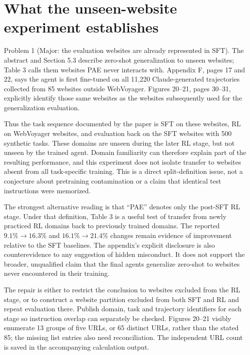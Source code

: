 \documentclass[10pt]{article}
\begin{document}
\section*{What the unseen-website experiment establishes}
Problem 1 (Major: the evaluation websites are already represented in SFT).  The abstract and Section 5.3 describe zero-shot generalization to unseen websites; Table 3 calls them websites PAE never interacts with. Appendix F, pages 17 and 22, says the agent is first fine-tuned on all 11,220 Claude-generated trajectories collected from 85 websites outside WebVoyager. Figures 20–21, pages 30–31, explicitly identify those same websites as the websites subsequently used for the generalization evaluation.\par
Thus the task sequence documented by the paper is SFT on these websites, RL on WebVoyager websites, and evaluation back on the SFT websites with 500 synthetic tasks. These domains are unseen during the later RL stage, but not unseen by the trained agent. Domain familiarity can therefore explain part of the resulting performance, and this experiment does not isolate transfer to websites absent from all task-specific training. This is a direct split-definition issue, not a conjecture about pretraining contamination or a claim that identical test instructions were memorized.\par
The strongest alternative reading is that “PAE” denotes only the post-SFT RL stage. Under that definition, Table 3 is a useful test of transfer from newly practiced RL domains back to previously trained domains. The reported \(9.1\%\to16.3\%\) and \(16.1\%\to21.4\%\) changes remain evidence of improvement relative to the SFT baselines. The appendix’s explicit disclosure is also counterevidence to any suggestion of hidden misconduct. It does not support the broader, unqualified claim that the final agents generalize zero-shot to websites never encountered in their training.\par
The repair is either to restrict the conclusion to websites excluded from the RL stage, or to construct a website partition excluded from both SFT and RL and repeat evaluation there. Publish domain, task and trajectory identifiers for each stage so instruction overlap can separately be checked. Figures 20–21 visibly enumerate 13 groups of five URLs, or 65 distinct URLs, rather than the stated 85; the missing list entries also need reconciliation. The independent URL count is saved in the accompanying calculation output.\par
\end{document}
